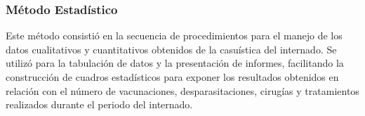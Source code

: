 	\subsubsection{Método Estadístico}

	Este método consistió en la secuencia de procedimientos para el manejo de los datos cualitativos y cuantitativos obtenidos de la casuística del internado. Se utilizó para la tabulación de datos y la presentación de informes, facilitando la construcción de cuadros estadísticos para exponer los resultados obtenidos en relación con el número de vacunaciones, desparasitaciones, cirugías y tratamientos realizados durante el periodo del internado.
